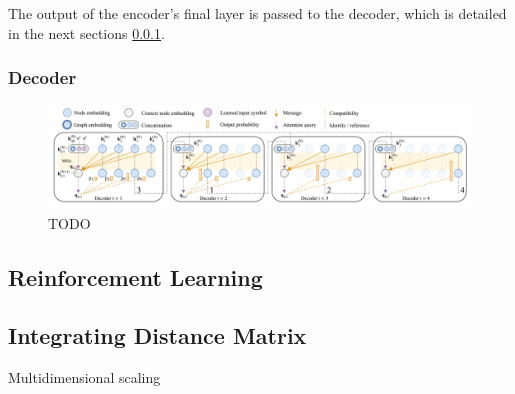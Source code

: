     The output of the encoder's final layer is passed to the decoder, which is detailed in the next sections \ref{vrptw-decoder}.
    
    \subsubsection{Decoder}\label{vrptw-decoder}
    
    \begin{figure}[ht]
        \centering
        \includegraphics[width=1.0\textwidth]{resources/vrptw-ai/decoder-diagram.png}
        \caption{TODO \cite{attention-route}}
        \label{fig:encoder-diagram}
    \end{figure}
    
    \subsection{Reinforcement Learning}\label{vrptw-rl}
        
    \subsection{Integrating Distance Matrix}
    Multidimensional scaling
